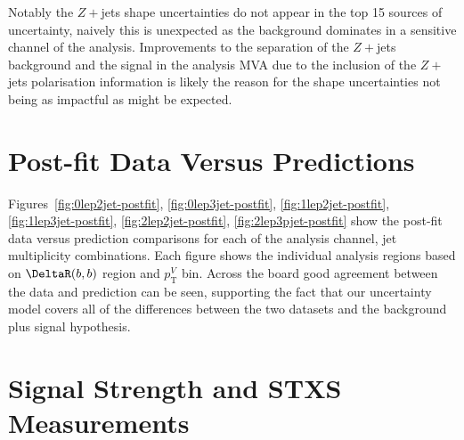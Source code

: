 Notably the $Z+$jets shape uncertainties do not appear in the top 15 sources of
uncertainty, naively this is unexpected as the background dominates in a
sensitive channel of the analysis. Improvements to the separation of the
$Z+$jets background and the signal in the analysis MVA due to the inclusion of
the $Z+$jets polarisation information is likely the reason for the shape
uncertainties not being as impactful as might be expected. 
\clearpage

\section{Post-fit Data Versus Predictions}
Figures~\ref{fig:0lep2jet-postfit}, \ref{fig:0lep3jet-postfit},
\ref{fig:1lep2jet-postfit}, \ref{fig:1lep3jet-postfit},
\ref{fig:2lep2jet-postfit}, \ref{fig:2lep3pjet-postfit} show the post-fit data
versus prediction comparisons for each of the analysis channel, jet multiplicity
combinations. Each figure shows the individual analysis regions based on
$\DeltaR(b, b)$ region and $p_{\mathrm{T}}^V$ bin. Across the board good
agreement between the data and prediction can be seen, supporting the fact that
our uncertainty model covers all of the differences between the two datasets and
the background plus signal hypothesis.







\clearpage

\section{Signal Strength and STXS Measurements}

% 


